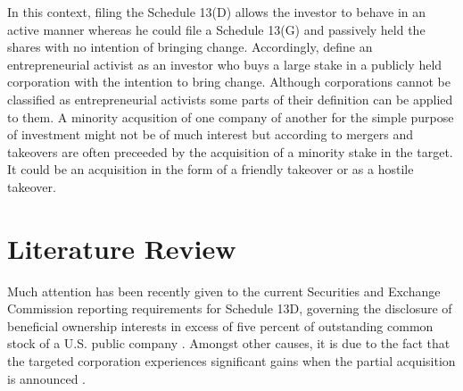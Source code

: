 \documentclass[12pt]{article}
\begin{document}
In this context, filing the Schedule 13(D) allows the investor to behave in an active manner \citep{Brigida2012} whereas he could file a Schedule 13(G) and passively held the shares with no intention of bringing change. Accordingly, \citet{Klein2009} define an entrepreneurial activist as an investor who buys a large stake in a publicly held corporation with the intention to bring change. Although corporations cannot be classified as entrepreneurial activists some parts of their definition can be applied to them. A minority acqusition of one company of another for the simple purpose of investment might not be of much interest but according to \citet{Goldman2005} mergers and takeovers are often preceeded by the acquisition of a minority stake in the target. It could be an acquisition in the form of a friendly takeover or as a hostile takeover.  

\section{Literature Review}
Much attention has been recently given to the current Securities and Exchange Commission reporting requirements for Schedule 13D, governing the disclosure of beneficial ownership interests in excess of five percent of outstanding common stock of a U.S. public company \citep{Giglia2018}. Amongst other causes, it is due to the fact that the targeted corporation experiences significant gains when the partial acquisition is announced \citep{Akhigbe2007}. %
\end{document}
